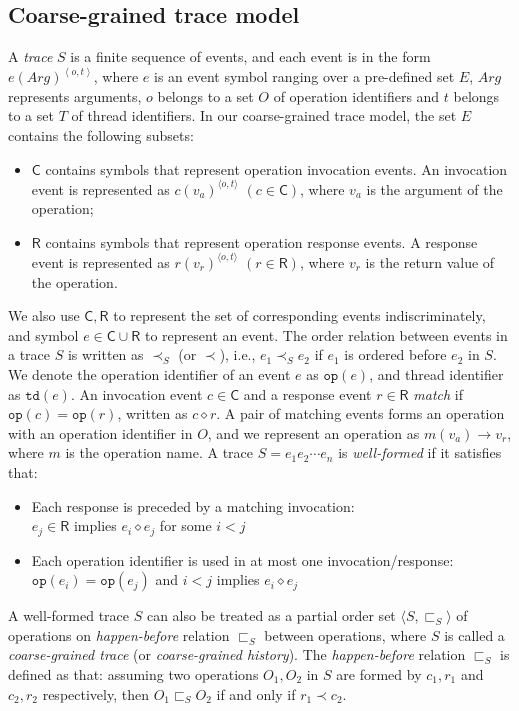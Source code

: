 \documentclass[runningheads]{llncs}
\newcommand{\ecall}{\mathsf{C}}
\newcommand{\eresp}{\mathsf{R}}
\newcommand{\pair}[1]{{\langle{#1}\rangle}}
\begin{document}
\subsection{Coarse-grained trace model}\label{sec:coarsegraintm}
A \textit{trace} $S$ is a finite sequence of events, and each event is in the form $e(\mathit{Arg})^{\left\langle o,t\right\rangle}$, where $e$ is an event symbol ranging over a pre-defined set $E$, $\mathit{Arg}$ represents arguments, $o$ belongs to a set $O$ of operation identifiers and $t$ belongs to a set $T$ of thread identifiers. In our coarse-grained trace model, the set $E$ contains the following subsets:
\begin{itemize}
  \item $\ecall$ contains symbols that represent operation invocation events. An invocation event is represented as $c(v_a)^{\langle o,t\rangle}$ $(c\in \ecall)$, where $v_a$ is the argument of the operation;
  \item $\eresp$ contains symbols that represent operation response events. A response event is represented as $r(v_r)^{\langle o,t\rangle}$ $(r\in \eresp)$, where $v_r$ is the return value of the operation.
\end{itemize}
\noindent We also use $\ecall, \eresp$ to represent the set of corresponding events indiscriminately, and symbol $e\in \ecall\cup \eresp$ to represent an event. The order relation between events in a trace $S$ is written as $\prec_S$ (or $\prec$), i.e., $e_1\prec_S e_2$ if $e_1$ is ordered before $e_2$ in $S$. We denote the operation identifier of an event $e$ as $\mathtt{op}(e)$, and thread identifier as $\mathtt{td}(e)$. An invocation event $c\in \ecall$ and a response event $r\in \eresp$ \textit{match} if $\mathtt{op}(c) = \mathtt{op}(r)$, written as $c\diamond r$. A pair of matching events forms an operation with an operation identifier in $O$, and we represent an operation as $m(v_a)\to v_r$, where $m$ is the operation name.
 A trace $S = e_1e_2\cdots e_n$ is \textit{well-formed} if it satisfies that:
\begin{itemize}
  \item Each response is preceded by a matching invocation:\\
  $e_j\in \eresp$ implies $e_i \diamond e_j$ for some $i<j$
  \item Each operation identifier is used in at most one invocation/response:\\
  $\mathtt{op}(e_i)=\mathtt{op}(e_j)$ and $i<j$ implies $e_i \diamond e_j$
\end{itemize}
 A well-formed trace $S$ can also be treated as a partial order set $\pair{S,\sqsubset_S}$ of operations on \textit{happen-before} relation $\sqsubset_S$ between operations, where $S$ is called a \textit{coarse-grained trace} (or \textit{coarse-grained history}). The \textit{happen-before} relation $\sqsubset_S$ is defined as that: assuming two operations $O_1,O_2$ in $S$ are formed by $c_1,r_1$ and $c_2,r_2$ respectively, then $O_1\sqsubset_S O_2$ if and only if $r_1\prec c_2$.
\end{document}
